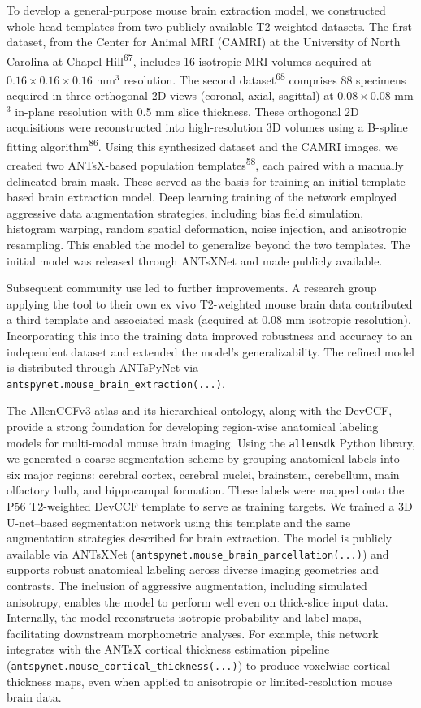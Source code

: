 \documentclass[
  12pt,
]{article}
\begin{document}
To develop a general-purpose mouse brain extraction model, we
constructed whole-head templates from two publicly available T2-weighted
datasets. The first dataset, from the Center for Animal MRI (CAMRI) at
the University of North Carolina at Chapel Hill\textsuperscript{67},
includes 16 isotropic MRI volumes acquired at
\(0.16 \times 0.16 \times 0.16\) mm\(^3\) resolution. The second
dataset\textsuperscript{68} comprises 88 specimens acquired in three
orthogonal 2D views (coronal, axial, sagittal) at \(0.08 \times 0.08\)
mm\(^3\) in-plane resolution with 0.5 mm slice thickness. These
orthogonal 2D acquisitions were reconstructed into high-resolution 3D
volumes using a B-spline fitting algorithm\textsuperscript{86}. Using
this synthesized dataset and the CAMRI images, we created two
ANTsX-based population templates\textsuperscript{58}, each paired with a
manually delineated brain mask. These served as the basis for training
an initial template-based brain extraction model. Deep learning training
of the network employed aggressive data augmentation strategies,
including bias field simulation, histogram warping, random spatial
deformation, noise injection, and anisotropic resampling. This enabled
the model to generalize beyond the two templates. The initial model was
released through ANTsXNet and made publicly available.

Subsequent community use led to further improvements. A research group
applying the tool to their own ex vivo T2-weighted mouse brain data
contributed a third template and associated mask (acquired at 0.08 mm
isotropic resolution). Incorporating this into the training data
improved robustness and accuracy to an independent dataset and extended
the model's generalizability. The refined model is distributed through
ANTsPyNet via \texttt{antspynet.mouse\_brain\_extraction(...)}.

The AllenCCFv3 atlas and its hierarchical ontology, along with the
DevCCF, provide a strong foundation for developing region-wise
anatomical labeling models for multi-modal mouse brain imaging. Using
the \texttt{allensdk} Python library, we generated a coarse segmentation
scheme by grouping anatomical labels into six major regions: cerebral
cortex, cerebral nuclei, brainstem, cerebellum, main olfactory bulb, and
hippocampal formation. These labels were mapped onto the P56 T2-weighted
DevCCF template to serve as training targets. We trained a 3D
U-net--based segmentation network using this template and the same
augmentation strategies described for brain extraction. The model is
publicly available via ANTsXNet
(\texttt{antspynet.mouse\_brain\_parcellation(...)}) and supports robust
anatomical labeling across diverse imaging geometries and contrasts. The
inclusion of aggressive augmentation, including simulated anisotropy,
enables the model to perform well even on thick-slice input data.
Internally, the model reconstructs isotropic probability and label maps,
facilitating downstream morphometric analyses. For example, this network
integrates with the ANTsX cortical thickness estimation pipeline
(\texttt{antspynet.mouse\_cortical\_thickness(...)}) to produce
voxelwise cortical thickness maps, even when applied to anisotropic or
limited-resolution mouse brain data.
\end{document}
